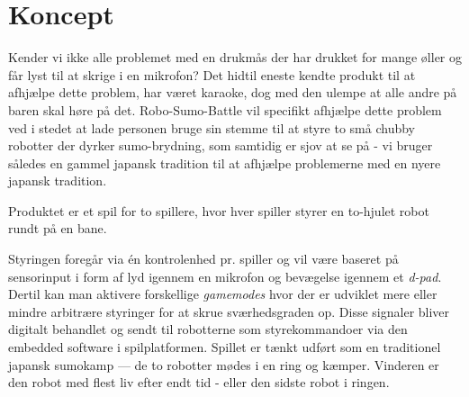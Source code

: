 \section{Koncept}
\noindent Kender vi ikke alle problemet med en drukmås der har drukket for mange øller og får lyst til at skrige i en mikrofon? Det hidtil eneste kendte produkt til at afhjælpe dette problem, har været karaoke, dog med den ulempe at alle andre på baren skal høre på det. Robo-Sumo-Battle vil specifikt afhjælpe dette problem ved i stedet at lade personen bruge sin stemme til at styre to små chubby robotter der dyrker sumo-brydning, som samtidig er sjov at se på - vi bruger således en gammel japansk tradition til at afhjælpe problemerne med en nyere japansk tradition. 

Produktet er et spil for to spillere, hvor hver spiller styrer en to-hjulet robot rundt på en bane.

Styringen foregår via én kontrolenhed pr. spiller og vil være baseret på sensorinput i form af lyd igennem en mikrofon og bevægelse igennem et \textit{d-pad}. Dertil kan man aktivere forskellige \textit{gamemodes} hvor der er udviklet mere eller mindre arbitrære styringer for at skrue sværhedsgraden op. 
Disse signaler bliver digitalt behandlet og sendt til robotterne som styrekommandoer via den embedded software i spilplatformen.
Spillet er tænkt udført som en traditionel japansk sumokamp --- de to robotter mødes i en ring og kæmper. Vinderen er den robot med flest liv efter endt tid - eller den sidste robot i ringen.

